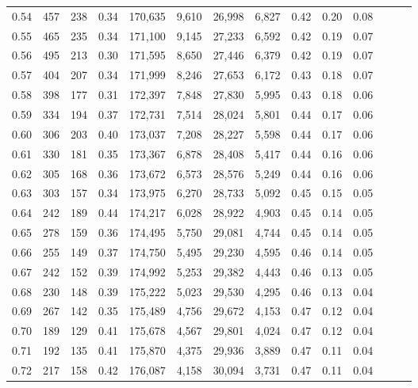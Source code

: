 \begin{tabular}{rrrrrrrrrrrrrr}
0.54 &    457 &  238 &  0.34 &  170,635 &    9,610 &  26,998 &   6,827 &  0.42 &  0.20 &      0.08 \\
0.55 &    465 &  235 &  0.34 &  171,100 &    9,145 &  27,233 &   6,592 &  0.42 &  0.19 &      0.07 \\
0.56 &    495 &  213 &  0.30 &  171,595 &    8,650 &  27,446 &   6,379 &  0.42 &  0.19 &      0.07 \\
0.57 &    404 &  207 &  0.34 &  171,999 &    8,246 &  27,653 &   6,172 &  0.43 &  0.18 &      0.07 \\
0.58 &    398 &  177 &  0.31 &  172,397 &    7,848 &  27,830 &   5,995 &  0.43 &  0.18 &      0.06 \\
0.59 &    334 &  194 &  0.37 &  172,731 &    7,514 &  28,024 &   5,801 &  0.44 &  0.17 &      0.06 \\
0.60 &    306 &  203 &  0.40 &  173,037 &    7,208 &  28,227 &   5,598 &  0.44 &  0.17 &      0.06 \\
0.61 &    330 &  181 &  0.35 &  173,367 &    6,878 &  28,408 &   5,417 &  0.44 &  0.16 &      0.06 \\
0.62 &    305 &  168 &  0.36 &  173,672 &    6,573 &  28,576 &   5,249 &  0.44 &  0.16 &      0.06 \\
0.63 &    303 &  157 &  0.34 &  173,975 &    6,270 &  28,733 &   5,092 &  0.45 &  0.15 &      0.05 \\
0.64 &    242 &  189 &  0.44 &  174,217 &    6,028 &  28,922 &   4,903 &  0.45 &  0.14 &      0.05 \\
0.65 &    278 &  159 &  0.36 &  174,495 &    5,750 &  29,081 &   4,744 &  0.45 &  0.14 &      0.05 \\
0.66 &    255 &  149 &  0.37 &  174,750 &    5,495 &  29,230 &   4,595 &  0.46 &  0.14 &      0.05 \\
0.67 &    242 &  152 &  0.39 &  174,992 &    5,253 &  29,382 &   4,443 &  0.46 &  0.13 &      0.05 \\
0.68 &    230 &  148 &  0.39 &  175,222 &    5,023 &  29,530 &   4,295 &  0.46 &  0.13 &      0.04 \\
0.69 &    267 &  142 &  0.35 &  175,489 &    4,756 &  29,672 &   4,153 &  0.47 &  0.12 &      0.04 \\
0.70 &    189 &  129 &  0.41 &  175,678 &    4,567 &  29,801 &   4,024 &  0.47 &  0.12 &      0.04 \\
0.71 &    192 &  135 &  0.41 &  175,870 &    4,375 &  29,936 &   3,889 &  0.47 &  0.11 &      0.04 \\
0.72 &    217 &  158 &  0.42 &  176,087 &    4,158 &  30,094 &   3,731 &  0.47 &  0.11 &      0.04 \\

\end{tabular}
